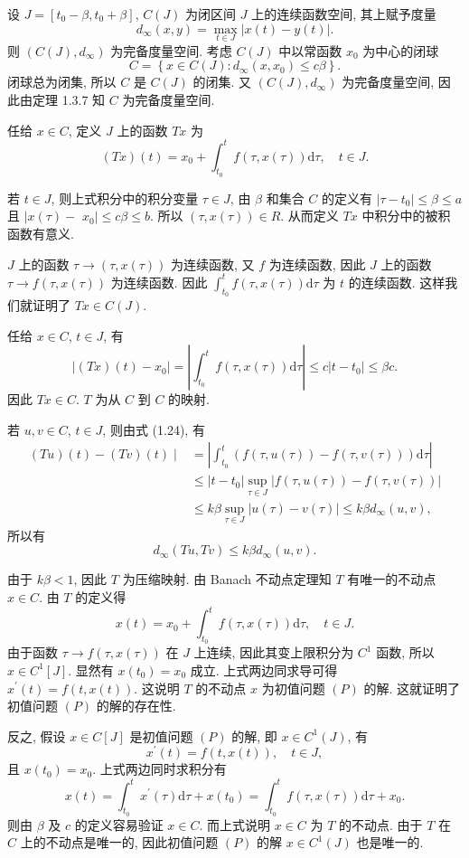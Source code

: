 \documentclass[openany]{ctexbook}
\makeatletter
\theoremstyle{kaiti}
\theoremstyle{normal}
\renewenvironment{proof}[1][\proofname]{\par
    \pushQED{\qed}%
    \normalfont \topsep6\p@\@plus6\p@\relax
    \trivlist
    \item\relax
    {\heiti #1}\hspace{2\labelsep}\ignorespaces
  }{%
    \popQED\endtrivlist\@endpefalse
  }
\makeatother
\begin{document}
\begin{proof}
设 $J=\left[t_0-\beta, t_0+\beta\right]$, $C(J)$ 为闭区间 $J$ 上的连续函数空间, 其上赋予度量
$$
d_{\infty}(x, y)=\max_{t \in J}|x(t)-y(t)|.
$$
则 $\left(C(J), d_{\infty}\right)$ 为完备度量空间. 考虑 $C(J)$ 中以常函数 $x_0$ 为中心的闭球
$$
C=\left\{x \in C(J): d_{\infty}\left(x, x_0\right) \leqslant c \beta\right\}.
$$
闭球总为闭集, 所以 $C$ 是 $C(J)$ 的闭集. 又 $\left(C(J), d_{\infty}\right)$ 为完备度量空间, 因此由定理 1.3.7 知 $C$ 为完备度量空间.

任给 $x \in C$, 定义 $J$ 上的函数 $T x$ 为
$$
(T x)(t)=x_0+\int_{t_0}^{t} f(\tau, x(\tau)) \mathrm{d} \tau, \quad t \in J.
$$

若 $t \in J$, 则上式积分中的积分变量 $\tau \in J$, 由 $\beta$ 和集合 $C$ 的定义有 $\left|\tau-t_0\right| \leqslant \beta \leqslant a$ 且 $\mid x(\tau)-$ $x_0 \mid \leqslant c \beta \leqslant b$. 所以 $(\tau, x(\tau)) \in R$. 从而定义 $T x$ 中积分中的被积函数有意义.

$J$ 上的函数 $\tau \rightarrow(\tau, x(\tau))$ 为连续函数, 又 $f$ 为连续函数, 因此 $J$ 上的函数 $\tau \rightarrow f(\tau, x(\tau))$ 为连续函数. 因此 $\int_{t_0}^{t} f(\tau, x(\tau)) \mathrm{d} \tau$ 为 $t$ 的连续函数. 这样我们就证明了 $T x \in C(J)$.

任给 $x \in C$, $t \in J$, 有
$$
\left|(T x)(t)-x_0\right|=\left|\int_{t_0}^{t} f(\tau, x(\tau)) \mathrm{d} \tau\right| \leqslant c\left|t-t_0\right| \leqslant \beta c.
$$
因此 $T x \in C$. $T$ 为从 $C$ 到 $C$ 的映射.

若 $u, v \in C$, $t \in J$, 则由式 (1.24), 有
$$
\begin{aligned}
(T u)(t)-(T v)(t) \mid &=\left|\int_{t_0}^{t}(f(\tau, u(\tau))-f(\tau, v(\tau))) \mathrm{d} \tau\right| \\
& \leqslant\left|t-t_0\right| \sup_{\tau \in J}|f(\tau, u(\tau))-f(\tau, v(\tau))| \\
& \leqslant k \beta \sup_{\tau \in J}|u(\tau)-v(\tau)| \leqslant k \beta d_{\infty}(u, v),
\end{aligned}
$$
所以有
$$
d_{\infty}(T u, T v) \leqslant k \beta d_{\infty}(u, v).
$$

由于 $k\beta<1$, 因此 $T$ 为压缩映射. 由 Banach 不动点定理知 $T$ 有唯一的不动点 $x \in C$. 由 $T$ 的定义得
$$
x(t)=x_0+\int_{t_0}^{t} f(\tau, x(\tau)) \mathrm{d} \tau, \quad t \in J.
$$
由于函数 $\tau \rightarrow f(\tau, x(\tau))$ 在 $J$ 上连续, 因此其变上限积分为 $C^1$ 函数, 所以 $x \in C^1[J]$. 显然有 $x\left(t_0\right)=x_0$ 成立. 上式两边同求导可得 $x^{\prime}(t)=f(t, x(t))$. 这说明 $T$ 的不动点 $x$ 为初值问题 $(P)$ 的解. 这就证明了初值问题 $(P)$ 的解的存在性.

反之, 假设 $x \in C[J]$ 是初值问题 $(P)$ 的解, 即 $x \in C^1(J)$, 有
$$
x^{\prime}(t)=f(t, x(t)), \quad t \in J,
$$
且 $x\left(t_0\right)=x_0$. 上式两边同时求积分有
$$
x(t)=\int_{t_0}^{t} x^{\prime}(\tau) \mathrm{d} \tau+x\left(t_0\right)=\int_{t_0}^{t} f(\tau, x(\tau)) \mathrm{d} \tau+x_0.
$$
则由 $\beta$ 及 $c$ 的定义容易验证 $x \in C$. 而上式说明 $x \in C$ 为 $T$ 的不动点. 由于 $T$ 在 $C$ 上的不动点是唯一的, 因此初值问题 $(P)$ 的解 $x \in C^1(J)$ 也是唯一的.
\end{proof}
\end{document}
